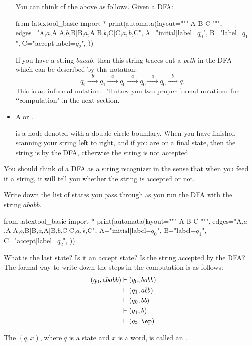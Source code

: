 \begin{itemize}
You can think of the above as follows.
Given a DFA:
\begin{python}
from latextool_basic import *
print(automata(layout="""
A  B  C
""",
edges="A,$a$,A|A,$b$,B|B,$a$,A|B,$b$,C|C,$a,b$,C",
A="initial|label=$q_0$",
B="label=$q_1$",
C="accept|label=$q_2$",
))
\end{python}
If you have a string $baaab$, then this string traces out a \textit{path}
in the DFA which can be described by this notation:
\[
q_0 \xrightarrow{\,\,\,\,\,b\,\,\,\,\,}
q_1 \xrightarrow{\,\,\,\,\,a\,\,\,\,\,}
q_0 \xrightarrow{\,\,\,\,\,a\,\,\,\,\,}
q_0 \xrightarrow{\,\,\,\,\,a\,\,\,\,\,}
q_0 \xrightarrow{\,\,\,\,\,b\,\,\,\,\,}
q_1
\]
This is an informal notation.
I'll show you two proper
formal notations for \lq\lq computation" in the next section.
\item
  A  or
  \sidebarskip{16pt}\sidebarskip{0pt}.

  is a node denoted with a double-circle boundary.
  When you have finished scanning your string left to right, and
  if you are on a final state, then
  the string is  by the DFA, otherwise the string is
  not accepted.

\end{itemize}

You should think of a DFA as a string recognizer in the sense that
when you feed it a string, it will tell you whether the string is
accepted or not.


\begin{eg}
Write down the list of states you pass through as you run the DFA
with the string $ababb$.
\begin{python}
from latextool_basic import *
print(automata(layout="""
A  B  C
""",
edges="A,$a$,A|A,$b$,B|B,$a$,A|B,$b$,C|C,$a,b$,C",
A="initial|label=$q_0$",
B="label=$q_1$",
C="accept|label=$q_2$",
))
\end{python}
What is the last state? Is it an
accept state? Is the string accepted by the DFA?
The formal way to write down the steps in the computation is as
follows:
\begin{align*}
 (q_0, ababb)
 &\vdash (q_0,babb) \cr
 &\vdash (q_1,abb) \cr
 &\vdash (q_0,bb) \cr
 &\vdash (q_1,b) \cr
 &\vdash (q_2,\ep) \cr
\end{align*}
\end{eg}

The $(q, x)$, where $q$ is a state and $x$ is a word, is called an
.

